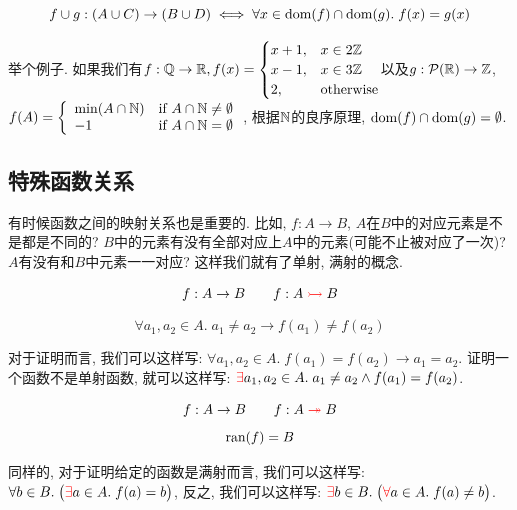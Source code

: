 \begin{theorem}
    {\[
      f \cup g: (A \cup C) \to (B \cup D) \iff
      \forall x \in \text{dom}(f) \cap \text{dom}(g).\; f(x) = g(x)
    \]}
\end{theorem}

举个例子. 如果我们有$f:\mathbb{Q} \to \mathbb{R}, f(x)=\begin{cases}
	x+1, &x\in 2\mathbb{Z} \\
	x-1, &x \in 3\mathbb{Z}\\
	2, & \text{otherwise}
\end{cases}$以及$g: \mathcal{P}(\mathbb{R}) \to \mathbb{Z}$, $f(A) = \left\{\begin{array}{ll}
    \min(A \cap \mathbb{N}) & \text{if } A \cap \mathbb{N} \neq \emptyset \\
      -1 & \text{if } A \cap \mathbb{N} = \emptyset
  \end{array}\right.$, 根据$\mathbb{N}$的良序原理, $\text{dom}{(f)}\cap \text{dom}{(g)}=\emptyset$. 
\subsection{特殊函数关系}

有时候函数之间的映射关系也是重要的. 比如, $f:A\to B$, $A$在$B$中的对应元素是不是都是不同的? $B$中的元素有没有全部对应上$A$中的元素(可能不止被对应了一次)? $A$有没有和$B$中元素一一对应? 这样我们就有了单射, 满射的概念. 

\begin{definition}
    \[
      f: A \to B \qquad {f: A \textcolor{red}{\;\rightarrowtail\;} B}
    \]

    \[
      \forall a_1, a_2 \in A.\; a_1 \neq a_2 \to f(a_1) \neq f(a_2)
    \]
\end{definition}

对于证明而言, 我们可以这样写: $\forall a_1, a_2 \in A.\; f(a_1) = f(a_2) \to a_1 = a_2$. 证明一个函数不是单射函数, 就可以这样写: $\textcolor{red}{\exists} a_1, a_2 \in A.\; a_1 \neq a_2 \land f(a_1) = f(a_2)$. 

\begin{definition}
    \[
      f: A \to B \qquad {f: A \textcolor{red}{\;\twoheadrightarrow\;} B}
    \]
    \[
      \text{ran}(f) = B
    \]
\end{definition}

同样的, 对于证明给定的函数是满射而言, 我们可以这样写: $\forall b \in B. \; \big(\textcolor{red}{\exists} a \in A.\; f(a) = b \big)$, 反之, 我们可以这样写: $\textcolor{red}{\exists} b \in B.\; \big(\textcolor{red}{\forall} a \in A.\; f(a) \neq b \big)$. 

